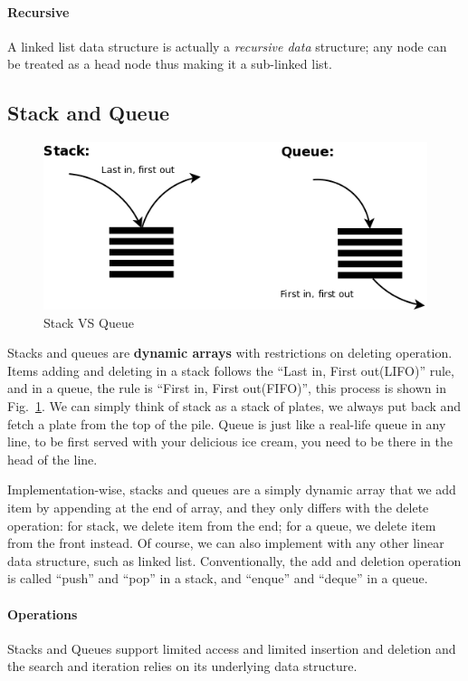 \documentclass[../main.tex]{subfiles}
\begin{document}
\paragraph{Recursive} A linked list data structure is actually a \textit{recursive data} structure; any node can be treated as a head node thus making it a sub-linked list.  
\subsection{Stack and Queue}
\begin{figure}[!ht]
    \centering
    \includegraphics[width=0.7\columnwidth]{fig/stack_queue_1.png}
    \caption{Stack VS Queue}
    \label{fig:stack_queue_1}
\end{figure}
Stacks and queues are \textbf{dynamic arrays} with restrictions on deleting operation. Items adding and deleting in a stack follows the ``Last in, First out(LIFO)'' rule, and in a queue, the rule is ``First in, First out(FIFO)'', this process is shown in Fig.~\ref{fig:stack_queue_1}.  We can simply think of stack as a stack of plates, we  always put back  and fetch a plate from the top of the pile. Queue is just like a real-life queue in any line, to be first served with your delicious ice cream, you need to be there in the head of the line. 


Implementation-wise, stacks and queues are a simply dynamic array that we add item by appending at the end of array, and they only differs with the delete operation: for stack, we delete item from the end; for a queue, we delete item from the front instead. Of course, we can also implement with any other linear data structure, such as linked list. Conventionally, the add and deletion operation is called  ``push'' and ``pop'' in a stack, and ``enque'' and ``deque'' in a queue.

\paragraph{Operations} Stacks and Queues support limited access and limited insertion and deletion and the search and iteration relies on its underlying data structure. 
\end{document}
